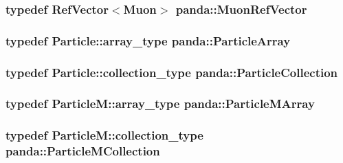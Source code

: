 \hypertarget{namespacepanda_acbb387f9b6ce80632d841326173e2aa6}{
\subsubsection[{MuonRefVector}]{\setlength{\rightskip}{0pt plus 5cm}typedef {\bf RefVector}$<${\bf Muon}$>$ {\bf panda::MuonRefVector}}}
\label{namespacepanda_acbb387f9b6ce80632d841326173e2aa6}
\hypertarget{namespacepanda_a52395e45df31cb15ccae720f9e67bf50}{
\subsubsection[{ParticleArray}]{\setlength{\rightskip}{0pt plus 5cm}typedef {\bf Particle::array\_\-type} {\bf panda::ParticleArray}}}
\label{namespacepanda_a52395e45df31cb15ccae720f9e67bf50}
\hypertarget{namespacepanda_a26c14e36590aae75f00bc3dd8fba58bf}{
\subsubsection[{ParticleCollection}]{\setlength{\rightskip}{0pt plus 5cm}typedef {\bf Particle::collection\_\-type} {\bf panda::ParticleCollection}}}
\label{namespacepanda_a26c14e36590aae75f00bc3dd8fba58bf}
\hypertarget{namespacepanda_a1049a1e05124964724245070cac428d5}{
\subsubsection[{ParticleMArray}]{\setlength{\rightskip}{0pt plus 5cm}typedef {\bf ParticleM::array\_\-type} {\bf panda::ParticleMArray}}}
\label{namespacepanda_a1049a1e05124964724245070cac428d5}
\hypertarget{namespacepanda_a1e461f36eeeecf119695e60acf10dbb6}{
\subsubsection[{ParticleMCollection}]{\setlength{\rightskip}{0pt plus 5cm}typedef {\bf ParticleM::collection\_\-type} {\bf panda::ParticleMCollection}}}
